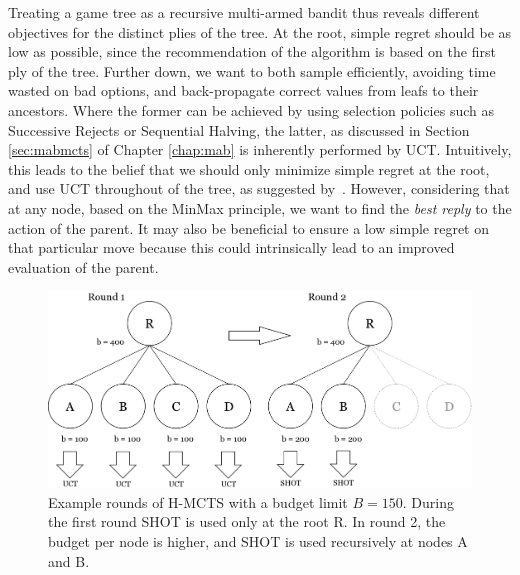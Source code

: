 \documentclass{kecsmstr}
\begin{document}
Treating a game tree as a recursive multi-armed bandit thus reveals different objectives for the distinct plies of the tree. At the root, simple regret should be as low as possible, since the recommendation of the algorithm is based on the first ply of the tree. Further down, we want to both sample efficiently, avoiding time wasted on bad options, and back-propagate correct values from leafs to their ancestors. Where the former can be achieved by using selection policies such as Successive Rejects or Sequential Halving, the latter, as discussed in Section \ref{sec:mabmcts} of Chapter \ref{chap:mab} is inherently performed by UCT. Intuitively, this leads to the belief that we should only minimize simple regret at the root, and use UCT throughout of the tree, as suggested by~. However, considering that at any node, based on the MinMax principle, we want to find the \emph{best reply} to the action of the parent. It may also be beneficial to ensure a low simple regret on that particular move because this could intrinsically lead to an improved evaluation of the parent.

\begin{figure}[ht]
	\centering
	\includegraphics[width=.8\textwidth]{img/H-MCTS_Rounds.png}
	\caption{Example rounds of H-MCTS with a budget limit $B = 150$. During the first round SHOT is used only at the root R. In round 2, the budget per node is higher, and SHOT is used recursively at nodes A and B.}
	\label{fig:h-mcts_rounds}
\end{figure}
\end{document}
